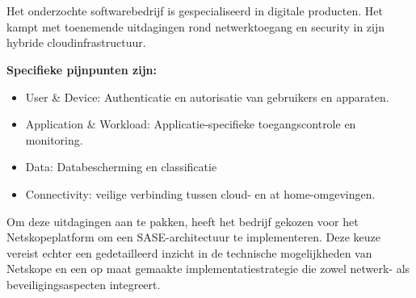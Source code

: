 \section{}%
\label{sec:probleemstelling}


Het onderzochte softwarebedrijf is gespecialiseerd in digitale producten. Het kampt met toenemende uitdagingen rond netwerktoegang en security in zijn hybride cloudinfrastructuur.

\vspace{2ex}

\textbf{Specifieke pijnpunten zijn:}

\begin{itemize}
  \item User \& Device: Authenticatie en autorisatie van gebruikers en apparaten.
	\item Application \& Workload: Applicatie-specifieke toegangscontrole en monitoring.
  \item Data: Databescherming en classificatie
  \item Connectivity: veilige verbinding tussen cloud- en at home-omgevingen.
\end{itemize}

Om deze uitdagingen aan te pakken, heeft het bedrijf gekozen voor het Netskopeplatform om een SASE-architectuur te implementeren. Deze keuze vereist echter een gedetailleerd inzicht in de technische mogelijkheden van Netskope en een op maat gemaakte implementatiestrategie die zowel netwerk- als beveiligingsaspecten integreert.

\section{}%
\label{sec:onderzoeksvraag}


